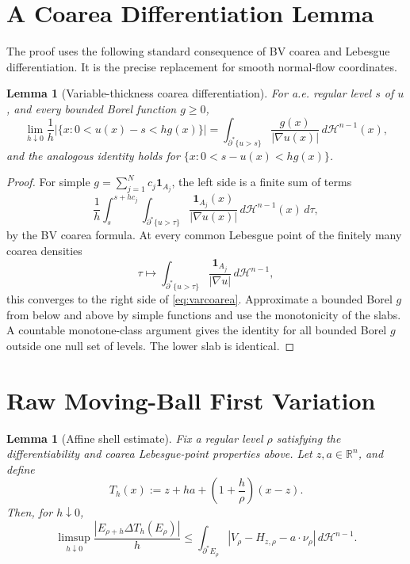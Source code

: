 \documentclass[11pt]{article}
\newtheorem{lemma}[theorem]{Lemma}
\theoremstyle{definition}
\newcommand{\R}{\mathbb R}
\newcommand{\HH}{\mathcal H}
\begin{document}
\section{A Coarea Differentiation Lemma}

The proof uses the following standard consequence of BV coarea and Lebesgue
differentiation.  It is the precise replacement for smooth normal-flow
coordinates.

\begin{lemma}[Variable-thickness coarea differentiation]\label{lem:varcoarea}
For a.e. regular level \(s\) of \(u\), and every bounded Borel function
\(g\ge0\),
\begin{equation}\label{eq:varcoarea}
   \lim_{h\downarrow0}\frac1h
   \left|\{x:0<u(x)-s<hg(x)\}\right|
   =
   \int_{\partial^*\{u>s\}}\frac{g(x)}{|\nabla u(x)|}\,d\HH^{n-1}(x),
\end{equation}
and the analogous identity holds for \(\{x:0<s-u(x)<hg(x)\}\).
\end{lemma}

\begin{proof}
For simple \(g=\sum_{j=1}^N c_j\mathbf1_{A_j}\), the left side is a finite
sum of terms
\[
   \frac1h\int_s^{s+hc_j}
      \int_{\partial^*\{u>\tau\}}
      \frac{\mathbf1_{A_j}(x)}{|\nabla u(x)|}\,d\HH^{n-1}(x)\,d\tau ,
\]
by the BV coarea formula.  At every common Lebesgue point of the finitely
many coarea densities
\[
   \tau\mapsto
   \int_{\partial^*\{u>\tau\}}
      \frac{\mathbf1_{A_j}}{|\nabla u|}\,d\HH^{n-1},
\]
this converges to the right side of \eqref{eq:varcoarea}.  Approximate a
bounded Borel \(g\) from below and above by simple functions and use the
monotonicity of the slabs.  A countable monotone-class argument gives the
identity for all bounded Borel \(g\) outside one null set of levels.  The
lower slab is identical.
\end{proof}

\section{Raw Moving-Ball First Variation}

\begin{lemma}[Affine shell estimate]\label{lem:shell}
Fix a regular level \(\rho\) satisfying the differentiability and coarea
Lebesgue-point properties above.  Let \(z,a\in\R^n\), and define
\[
   T_h(x):=z+ha+\left(1+\frac{h}{\rho}\right)(x-z).
\]
Then, for \(h\downarrow0\),
\begin{equation}\label{eq:shell}
   \limsup_{h\downarrow0}
   \frac{|E_{\rho+h}\Delta T_h(E_\rho)|}{h}
   \le
   \int_{\partial^*E_\rho}
      |V_\rho-H_{z,\rho}-a\cdot\nu_\rho|\,d\HH^{n-1}.
\end{equation}
\end{lemma}
\end{document}

